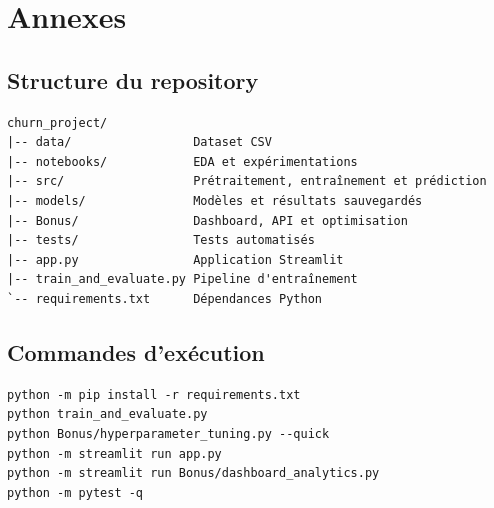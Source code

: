 \documentclass[12pt, a4paper]{article}
\begin{document}
\clearpage
\section{Annexes}

\subsection{Structure du repository}

\begin{verbatim}
churn_project/
|-- data/                 Dataset CSV
|-- notebooks/            EDA et expérimentations
|-- src/                  Prétraitement, entraînement et prédiction
|-- models/               Modèles et résultats sauvegardés
|-- Bonus/                Dashboard, API et optimisation
|-- tests/                Tests automatisés
|-- app.py                Application Streamlit
|-- train_and_evaluate.py Pipeline d'entraînement
`-- requirements.txt      Dépendances Python
\end{verbatim}

\subsection{Commandes d'exécution}

\begin{verbatim}
python -m pip install -r requirements.txt
python train_and_evaluate.py
python Bonus/hyperparameter_tuning.py --quick
python -m streamlit run app.py
python -m streamlit run Bonus/dashboard_analytics.py
python -m pytest -q
\end{verbatim}
\end{document}
